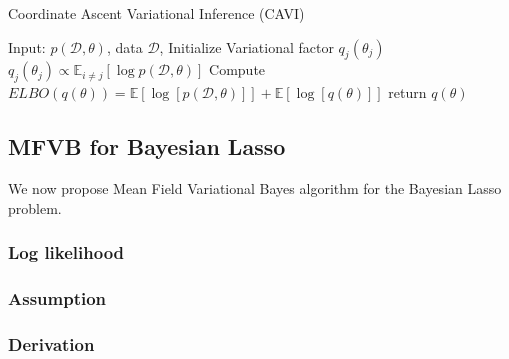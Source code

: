 \begin{algorithm}
	\caption{Coordinate Ascent Variational Inference (CAVI)}
	\begin{algorithmic}[1]
		
		\State Input: $p(\mathcal{D},\theta)$, data $\mathcal{D}$, Initialize Variational factor $q_j(\theta_j)$
		\State $q_j(\theta_j) \propto \mathbb{E}_{i\neq j}[\log p(\mathcal{D},\theta)]$
		\EndFor
		\State Compute $ELBO(q(\theta)) = \mathbb{E}[\log[p(\mathcal{D},\theta)]] + \mathbb{E}[\log[q(\theta)]]$
		\EndWhile 
		\State return $q(\theta)$
		
		
		
	\end{algorithmic}
\end{algorithm}



\subsection{MFVB for Bayesian Lasso}
We now propose Mean Field Variational Bayes algorithm for the Bayesian Lasso problem.
\subsubsection{Log likelihood}

\subsubsection{Assumption}

\subsubsection{Derivation}





